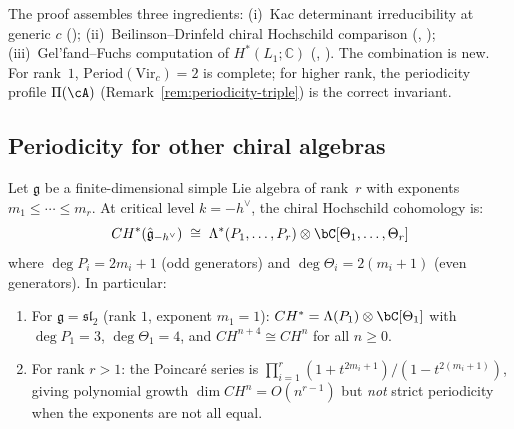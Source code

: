 \begin{remark}[Scope]
The proof assembles three ingredients: (i)~Kac determinant irreducibility at generic $c$ (\ClaimStatusProvedElsewhere); (ii)~Beilinson--Drinfeld chiral Hochschild comparison (\ClaimStatusProvedElsewhere, \cite{BD04}); (iii)~Gel'fand--Fuchs computation of $H^*(L_1; \mathbb{C})$ (\ClaimStatusProvedElsewhere, \cite{Fuks86}).  The combination is new.  For rank~$1$, $\mathrm{Period}(\mathrm{Vir}_c) = 2$ is complete; for higher rank, the periodicity profile $\Pi(\cA)$ (Remark~\ref{rem:periodicity-triple}) is the correct invariant.
\end{remark}

\subsection{Periodicity for other chiral algebras}

\begin{theorem}
\label{thm:affine-periodicity-critical}
Let $\mathfrak{g}$ be a finite-dimensional simple Lie algebra of rank~$r$
with exponents $m_1 \leq \cdots \leq m_r$.
At critical level $k = -h^{\vee}$, the chiral Hochschild cohomology is:
\[
CH^*(\hat{\mathfrak{g}}_{-h^{\vee}}) \;\cong\;
\Lambda^*(P_1, \ldots, P_r) \otimes \bC[\Theta_1, \ldots, \Theta_r]
\]
where $\deg P_i = 2m_i + 1$ (odd generators) and $\deg\Theta_i = 2(m_i + 1)$
(even generators).  In particular:
\begin{enumerate}
\item For $\mathfrak{g} = \mathfrak{sl}_2$ (rank $1$, exponent $m_1 = 1$):
$CH^* = \Lambda(P_1) \otimes \bC[\Theta_1]$ with $\deg P_1 = 3$,
$\deg\Theta_1 = 4$, and $CH^{n+4} \cong CH^n$ for all $n \geq 0$.
\item For rank $r > 1$: the Poincar\'e series is
$\prod_{i=1}^r (1 + t^{2m_i+1})/(1-t^{2(m_i+1)})$, giving polynomial
growth $\dim CH^n = O(n^{r-1})$ but \emph{not} strict periodicity when
the exponents are not all equal.
\end{enumerate}
\end{theorem}

